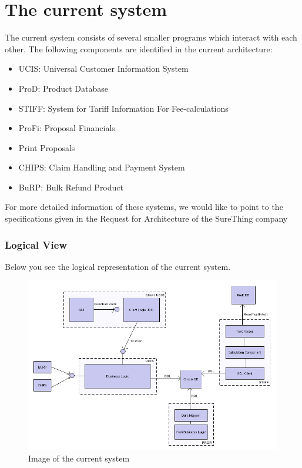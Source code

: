 \section{The current system}
The current system consists of several smaller programs which interact with each other. 
The following components are identified in the current architecture: 
\begin{itemize}
\item UCIS: Universal Customer Information System
\item ProD: Product Database
\item STIFF: System for Tariff Information For Fee-calculations
\item ProFi: Proposal Financials
\item Print Proposals
\item CHIPS: Claim Handling and Payment System
\item BuRP: Bulk Refund Product
\end{itemize}
For more detailed information of these systems, we would like to point to the spe\-ci\-fi\-ca\-tions
given in the Request for Architecture of the SureThing company

\subsubsection{Logical View}
Below you see the logical representation of the current system.
\begin{figure}[ht]
	\centering
		\includegraphics[width=1.00\textwidth]{img/logical-current.png}
	\caption{Image of the current system}
	\label{fig:logical-current}
\end{figure}

